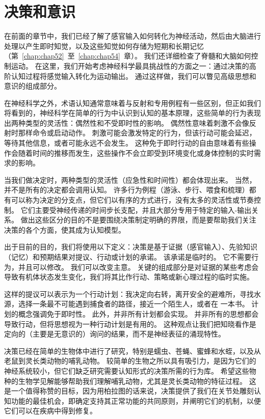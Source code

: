 \chapter{决策和意识} \label{chap:chap56}

在前面的章节中，我们已经了解了感官输入如何转化为神经活动，然后由大脑进行处理以产生即时知觉，以及这些知觉如何存储为短期和长期记忆（第~\ref{chap:chap52}~至~\ref{chap:chap54}~章）。
我们还详细检查了脊髓和大脑如何控制运动。
在这里，我们开始考虑神经科学最具挑战性的方面之一：通过决策的高阶认知过程将感觉输入转化为运动输出。
通过这样做，我们可以瞥见高级思想和意识的组成部分。


在神经科学之外，术语认知通常意味着与反射和专用例程有一些区别，但正如我们将看到的，神经科学在简单的行为中认识到认知的基本原理，这些简单的行为表现出两种类型的灵活性：偶然性和不受即时性的影响。
偶然性意味着刺激不会像反射时那样命令或启动动作。
刺激可能会激发特定的行为，但该行动可能会延迟，等待其他信息，或者可能永远不会发生。
这种免于即时行动的自由意味着有些操作会随着时间的推移而发生，这些操作不会立即受到环境变化或身体控制的实时需求的影响。


当我们做决定时，两种类型的灵活性（应急性和时间性）都会体现出来。
当然，并不是所有的决定都会调用认知。
许多行为例程（游泳、步行、喂食和梳理）都有可以称为决定的分支点，但它们以有序的方式进行，没有太多的灵活性或节奏控制。
它们主要受神经传递的时间步长支配，并且大部分专用于特定的输入-输出关系。
做出这些区分的目的不是要围绕决策制定明确的界限，而是要帮助我们关注决策的各个方面，使其成为认知模型。


出于目前的目的，我们将使用以下定义：决策是基于证据（感官输入）、先验知识（记忆）和预期结果对提议、行动或计划的承诺。
该承诺是临时的。
它不需要行为，并且可以修改。
我们可以改变主意。
关键的组成部分是对证据的某些考虑会导致有机体状态发生变化，我们将其比作行动、策略或新心理过程的临时实施。


这样的提议可以表示为一个行动计划：我决定向右转，离开安全的避难所，寻找水源，选择一条最不可能遇到捕食者的路径，接近一个陌生人，或者在 一本书。
计划的概念强调免于即时性。
此外，并非所有计划都会实现。 并非所有的思想都会导致行动，但将思想视为一种行动计划是有用的。
这种观点让我们把知晓看作是定向的（主要是无意识的）询问的结果，而不是神经表征的涌现特性。


决策已经在简单的生物体中进行了研究，特别是蠕虫、苍蝇、蜜蜂和水蛭，以及从老鼠到灵长类动物的哺乳动物。
较简单的生物之所以具有吸引力，是因为它们的神经系统较小，但它们缺乏研究需要认知形式的决策所需的行为库。
希望这些物种的生物学见解能够帮助我们理解哺乳动物，尤其是灵长类动物的特征过程。
这是一个值得称赞的目标，因为用柏拉图的话来说，决策提供了我们在关节处雕刻认知功能的最佳机会，即确定支持其正常功能的共同原则，并阐明它们的机制，以便它们可以在疾病中得到修复。


